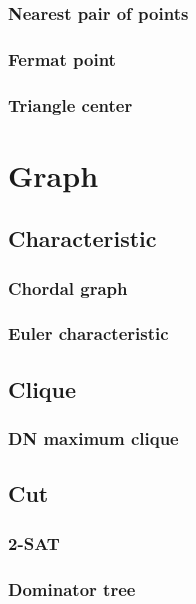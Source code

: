\documentclass[titlepage,a4paper,10pt]{article}
\begin{document}
\begin{multicols}{2}
\begin{spacing}{0.8}
{				\subsubsection{Nearest pair of points}
					
				\subsubsection{Fermat point}
					
				\subsubsection{Triangle center}
					
		\section{Graph}
			
			\subsection{Characteristic}
				\subsubsection{Chordal graph}
					
				\subsubsection{Euler characteristic}
					
			\subsection{Clique}
				\subsubsection{DN maximum clique}
					
			\subsection{Cut}
				\subsubsection{2-SAT}
					
				\subsubsection{Dominator tree}
					
}
\end{spacing}
\end{multicols}
\end{document}
